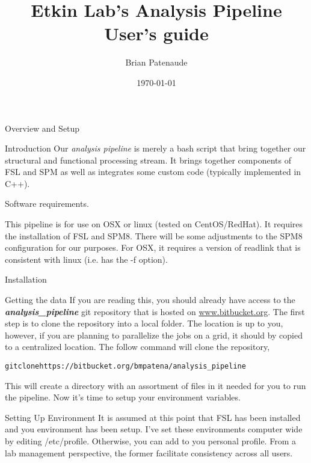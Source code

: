 \documentclass[]{report}
\begin{document}
\title{Etkin Lab's Analysis Pipeline User's guide}
\author{Brian Patenaude}
\date{\today}
\maketitle
\begin{chapter}{Overview and Setup}
\begin{section}{Introduction}
Our  {\it analysis pipeline} is merely a bash script that bring together our structural and functional processing stream. It brings together components of FSL and SPM as well as integrates some custom code (typically implemented in C++).  
\end{section}
\begin{section}{Software requirements.}

This pipeline is for use on OSX or linux (tested on CentOS/RedHat). It requires the installation of FSL and SPM8. There will be some adjustments to the SPM8 configuration for our purposes. For OSX, it requires a version of readlink that is consistent with linux (i.e. has the -f option).

\end{section}

\begin{section}{Installation}
\begin{subsection}{Getting the data}
If you are reading this, you should already have access to the {\bf \it analysis\_pipeline} git repository that is hosted on \url{www.bitbucket.org}. The first step is to clone the repository into a local folder. The location is up to you, however, if you are planning to parallelize the jobs on a grid, it should by copied to a centralized location. The follow command will clone the repository, 

\begin{alltt}
\hspace*{0.5in} 	git clone https://bitbucket.org/bmpatena/analysis_pipeline
\end{alltt}

This will create a directory with an assortment of files in it needed for you to run the pipeline. Now it's time to setup your environment variables.

\end{subsection}
\begin{subsection}{Setting Up Environment }
It is assumed at this point that FSL has been installed and you environment has been setup. I've set these environments computer wide by editing /etc/profile. Otherwise, you can add to you personal profile. From a lab management perspective, the former facilitate consistency across all users.


\end{subsection}
\end{section}
\end{chapter}
\end{document}
